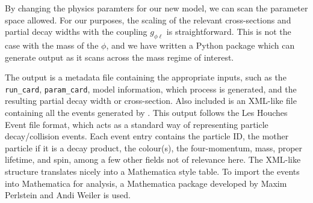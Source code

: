 By changing the physics paramters for our new model, we can scan the parameter space allowed.
For our purposes, the scaling of the relevant cross-sections and partial decay widths with the coupling $g_{\phi\ell}$ is straightforward.
This is not the case with the mass of the $\phi$, and we have written a Python package which can generate \madgraph output as it scans across the mass regime of interest.

The output is a metadata file containing the appropriate inputs, such as the \texttt{run\_card}, \texttt{param\_card}, model information, which process is generated, and the resulting partial decay width or cross-section.
Also included is an XML-like file containing all the events generated by \madgraph.
This output follows the Les Houches Event file format\cite{Alwall:2006yp}, which acts as a standard way of representing particle decay/collision events.
Each event entry contains the particle ID, the mother particle if it is a decay product, the colour(s), the four-momentum, mass, proper lifetime, and spin, among a few other fields not of relevance here.
The XML-like structure translates nicely into a Mathematica style table.
To import the events into Mathematica for analysis, a Mathematica package developed by Maxim Perlstein and Andi Weiler is used.

